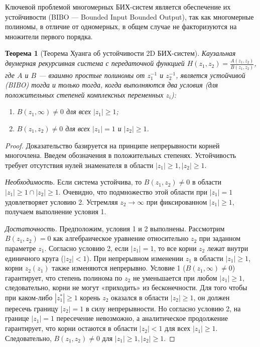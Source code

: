 \documentclass[12pt,a4paper]{article}
\newtheorem{theorem}{Теорема}
\begin{document}
Ключевой проблемой многомерных БИХ-систем является обеспечение их устойчивости (BIBO — Bounded Input Bounded Output), так как многомерные полиномы, в отличие от одномерных, в общем случае не факторизуются на множители первого порядка.

\begin{theorem}[Теорема Хуанга об устойчивости 2D БИХ-систем]
Каузальная двумерная рекурсивная система с передаточной функцией $H(z_1, z_2) = \frac{A(z_1, z_2)}{B(z_1, z_2)}$, где $A$ и $B$ — взаимно простые полиномы от $z_1^{-1}$ и $z_2^{-1}$, является устойчивой (BIBO) тогда и только тогда, когда выполняются два условия (для положительных степеней комплексных переменных $z_i$):
\begin{enumerate}
    \item $B(z_1, \infty) \neq 0$ для всех $|z_1| \ge 1$;
    \item $B(z_1, z_2) \neq 0$ для всех $|z_1| = 1$ и $|z_2| \ge 1$.
\end{enumerate}
\end{theorem}

\begin{proof}
Доказательство базируется на принципе непрерывности корней многочлена.
Введем обозначения в положительных степенях. Устойчивость требует отсутствия нулей знаменателя в области $|z_1| \ge 1, |z_2| \ge 1$.

\textit{Необходимость.} Если система устойчива, то $B(z_1, z_2) \neq 0$ в области $|z_1| \ge 1 \cap |z_2| \ge 1$. Очевидно, что подмножество этой области при $|z_1| = 1$ удовлетворяет условию 2. Устремляя $z_2 \to \infty$ при фиксированном $|z_1| \ge 1$, получаем выполнение условия 1.

\textit{Достаточность.} Предположим, условия 1 и 2 выполнены. Рассмотрим $B(z_1, z_2) = 0$ как алгебраическое уравнение относительно $z_2$ при заданном параметре $z_1$. Согласно условию 2, если $|z_1|=1$, то все корни $z_2$ лежат внутри единичного круга ($|z_2| < 1$).
При непрерывном изменении $z_1$ в области $|z_1| \ge 1$, корни $z_2(z_1)$ также изменяются непрерывно.
Условие 1 ($B(z_1, \infty) \neq 0$) гарантирует, что степень полинома по $z_2$ не уменьшается при любом $|z_1| \ge 1$, следовательно, корни не могут «приходить» из бесконечности.
Для того чтобы при каком-либо $|z_1^*| \ge 1$ корень $z_2$ оказался в области $|z_2| \ge 1$, он должен пересечь границу $|z_2| = 1$ в силу непрерывности. Но согласно условию 2, на границе $|z_1|=1$ пересечение невозможно, а аналитическое продолжение гарантирует, что корни остаются в области $|z_2| < 1$ для всех $|z_1| \ge 1$. Следовательно, $B(z_1, z_2) \neq 0$ для $|z_1| \ge 1, |z_2| \ge 1$.
\end{proof}
\end{document}
